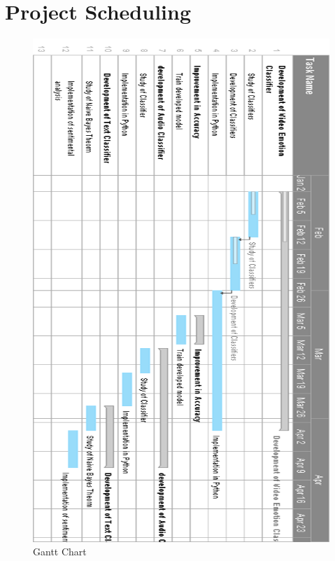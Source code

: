 \section{Project Scheduling}
\begin{figure}[h]
	\centering\includegraphics[scale=0.55]{images/gantt_rotate.png}
	\caption{Gantt Chart}
\end{figure}


